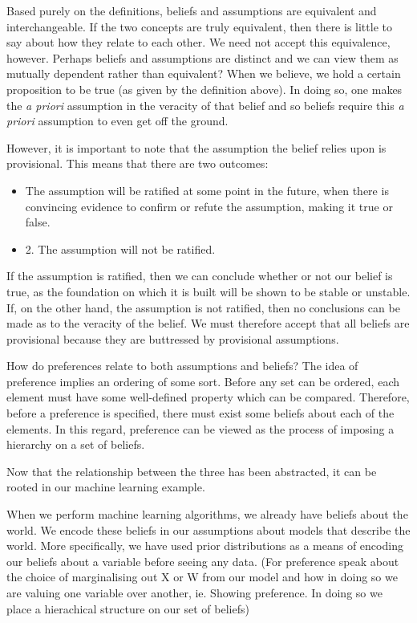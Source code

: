 \documentclass[13pt]{article}
\begin{document}
\begin{enumerate}
  Based purely on the definitions, beliefs and assumptions are equivalent and interchangeable. If the two concepts are truly equivalent, then there is little to say about how they relate to each other. We need not accept this equivalence, however. Perhaps beliefs and assumptions are distinct and we can view them as mutually dependent rather than equivalent? When we believe, we hold a certain proposition to be true (as given by the definition above). In doing so, one makes the \textit{a priori} assumption in the veracity of that belief and so beliefs require this \textit {a priori} assumption to even get off the ground.
  
  However, it is important to note that the assumption the belief relies upon is provisional. This means that there are two outcomes:
  \begin{itemize}
      \item The assumption will be ratified at some point in the future, when there is convincing evidence to confirm or refute the assumption, making it true or false.
  \end{itemize} 
  \begin{itemize}
      \item 2. The assumption will not be ratified.
  \end{itemize}
  If the assumption is ratified, then we can conclude whether or not our belief is true, as the foundation on which it is built will be shown to be stable or unstable. If, on the other hand, the assumption is not ratified, then no conclusions can be made as to the veracity of the belief.
  We must therefore accept that all beliefs are provisional because they are buttressed by provisional assumptions.
  
  How do preferences relate to both assumptions and beliefs? The idea of preference implies an ordering of some sort. Before any set can be ordered, each element must have some well-defined property which can be compared. Therefore, before a preference is specified, there must exist some beliefs about each of the elements. In this regard, preference can be viewed as the process of imposing a hierarchy on a set of beliefs.
  
  Now that the relationship between the three has been abstracted, it can be rooted in our machine learning example.
  
  When we perform machine learning algorithms, we already have beliefs about the world. We encode these beliefs in our assumptions about models that describe the world. More specifically, we have used prior distributions as a means of encoding our beliefs about a variable before seeing any data. (For preference speak about the choice of marginalising out X or W from our model and how in doing so we are valuing one variable over another, ie. Showing preference. In doing so we place a hierachical structure on our set of beliefs)
  

\end{enumerate}
\end{document}
